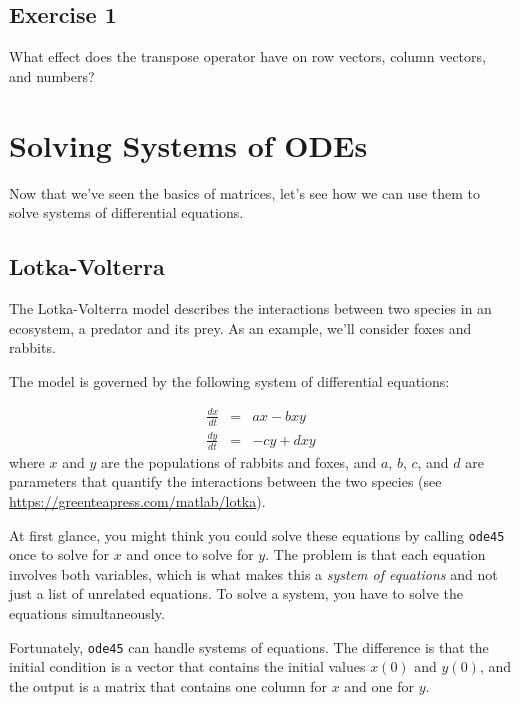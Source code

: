 \subsection{Exercise 1}
What effect does the transpose operator
have on row vectors, column vectors, and numbers?

\section{Solving Systems of ODEs}

Now that we've seen the basics of matrices, let's see how we can use them to solve systems of differential equations.

\subsection{Lotka-Volterra}
\label{lotka}

The Lotka-Volterra model describes the interactions between two
species in an ecosystem, a predator and its prey.  As an example, we'll consider foxes and rabbits.


The model is governed by the following system of differential equations:

\begin{eqnarray*}
    \frac{dx}{dt} &=& a x - b x y         \\
    \frac{dy}{dt} &=& -c y + d x y    
\end{eqnarray*}
%
where $x$ and $y$ are the populations of rabbits and foxes,
and $a$, $b$, $c$, and $d$ are parameters
that quantify the interactions between the two species (see
\url{https://greenteapress.com/matlab/lotka}).

At first glance, you might think you could solve these equations by
calling \lstinline{ode45} once to solve for $x$ and
once to solve for $y$.  The problem is that each equation involves
both variables, which is what makes this a \emph{system of equations}
and not just a list of unrelated equations.  To solve a system, you
have \linebreak to solve the equations simultaneously.


Fortunately, \lstinline{ode45} can handle systems of equations.  The
difference is that the initial condition is a vector that contains the
initial values $x(0)$ and $y(0)$, and the output is a matrix
that contains one column for $x$ and one for $y$.

